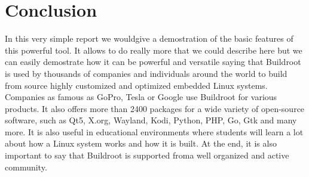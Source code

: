 \documentclass[a4paper,twoside,11pt]{article}
\begin{document}
\section{Conclusion}
In this very simple report we wouldgive a demostration of the basic features of this powerful tool.
It allows to do really more that we could describe here but we can easily demostrate how it can be powerful and versatile saying that Buildroot is used by thousands of companies and individuals around the world to build from source highly customized and optimized embedded Linux systems.
Companies as famous as GoPro, Tesla or Google use Buildroot for various products.
It also offers more than 2400 packages for a wide variety of open-source software, such as Qt5, X.org, Wayland, Kodi, Python, PHP, Go, Gtk and many
more.
It is also useful in educational environments where students will learn a lot about how a Linux system works and how it is built.
At the end, it is also important to say that Buildroot is supported froma well organized and active community.
\end{document}
